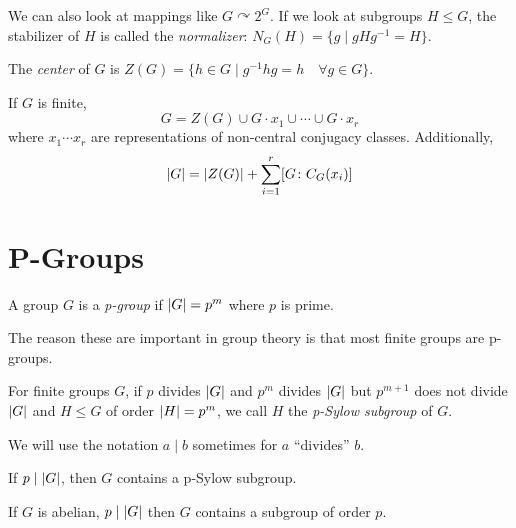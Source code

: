 \documentclass[a4paper,twoside,master.tex]{subfiles}
\begin{document}
\begin{definition}
    We can also look at mappings like $ G\curvearrowright 2^G $. If we look at subgroups $ H \leq G $, the stabilizer of $ H $ is called the \textit{normalizer}: $ N_G(H) = \{g \mid gHg^{-1} = H\} $.
\end{definition}

\begin{definition}
    The \textit{center} of $ G $ is $ Z(G) = \{h \in G \mid g^{-1} h g = h \quad\forall g \in G\} $.
\end{definition}
If $ G $ is finite,
\begin{equation}
    G = Z(G) \cup G \cdot x_1 \cup \cdots \cup G \cdot x_r
\end{equation}
where $ x_1 \cdots x_r $ are representations of non-central conjugacy classes. Additionally,
\begin{equation}
    \abs{G} = \abs{Z(G)} + \sum_{i = 1}^{r} [G \colon C_G(x_i)]
\end{equation}

\section{P-Groups}
\label{sec:p-groups}

\begin{definition}
    A group $ G $ is a \textit{p-group} if $ \abs{G} = p^m $ where $ p $ is prime.
\end{definition}

The reason these are important in group theory is that most finite groups are p-groups.

\begin{definition}
    For finite groups $ G $, if $ p $ divides $ \abs{G} $ and $ p^m $ divides $ \abs{G} $ but $ p^{m+1} $ does not divide $ \abs{G} $ and $ H \leq G $ of order $ \abs{H} = p^m $, we call $ H $ the \textit{p-Sylow subgroup} of $ G $.
\end{definition}

We will use the notation $ a \mid b $ sometimes for $ a $ ``divides'' $ b $.

\begin{theorem}[Sylow I]
    If $ p \mid \abs{G} $, then $ G $ contains a p-Sylow subgroup. 
\end{theorem}

\begin{lemma}
    If $ G $ is abelian, $ p \mid \abs{G} $ then $ G $ contains a subgroup of order $ p $.
\end{lemma}
\end{document}
